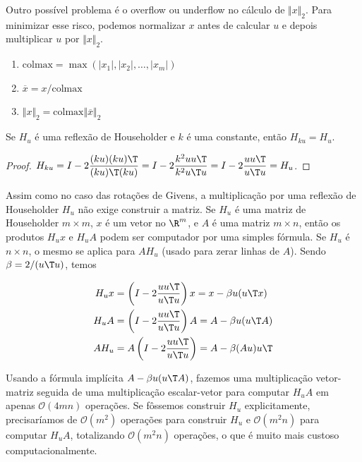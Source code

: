 \documentclass{article}
\begin{document}
Outro possível problema é o overflow ou underflow no cálculo de \(\Vert x \Vert_2\). Para minimizar esse risco, podemos normalizar \(x\) antes de calcular \(u\) e depois multiplicar \(u\) por \(\Vert x \Vert_2\).

\begin{enumerate}
    \item \(\text{colmax} = \max(|x_1|, |x_2|, \ldots, |x_m|)\)
    \item \(\overline{x} = x/\text{colmax}\)
    \item \(\Vert x \Vert_2 = \text{colmax} \Vert \overline{x} \Vert_2\)
\end{enumerate}

\begin{lem}
    Se \(H_u\) é uma reflexão de Householder e \(k\) é uma constante, então \(H_{ku} = H_u\).
\end{lem}

\begin{proof}
    \(\displaystyle H_{ku} = I - 2\frac{(ku)(ku)\T }{(ku)\T (ku)} = I - 2\frac{k^2 uu\T }{k^2 u\T u} = I - 2\frac{uu\T }{u\T u} = H_u\).
\end{proof}

Assim como no caso das rotações de Givens, a multiplicação por uma reflexão de Householder \(H_u\) não exige construir a matriz. Se \(H_u\) é uma matriz de Householder \(m\times m\), \(x\) é um vetor no \(\R^m\), e \(A\) é uma matriz \(m \times n\), então os produtos \(H_ux\) e \(H_uA\) podem ser computador por uma simples fórmula. Se \(H_u\) é \(n\times n\), o mesmo se aplica para \(AH_u\) (usado para zerar linhas de \(A\)). Sendo \(\beta = 2/(u\T u)\), temos

\begin{align}
    H_ux &= \left(I - 2\frac{uu\T }{u\T u}\right)x = x - \beta u(u\T x) \\
    H_uA &= \left(I - 2\frac{uu\T }{u\T u}\right)A = A - \beta u(u\T A) \\
    AH_u &= A\left(I - 2\frac{uu\T }{u\T u}\right) = A - \beta (Au)u\T 
\end{align}

Usando a fórmula implícita \(A - \beta u(u\T A)\), fazemos uma multiplicação vetor-matriz seguida de uma multiplicação escalar-vetor para computar \(H_uA\) em apenas \(\mathcal{O}(4mn)\) operações. Se fôssemos construir \(H_u\) explicitamente, precisaríamos de \(\mathcal{O}(m^2)\) operações para construir \(H_u\) e \(\mathcal{O}(m^2n)\) para computar \(H_uA\), totalizando \(\mathcal{O}(m^2n)\) operações, o que é muito mais custoso computacionalmente.
\end{document}
